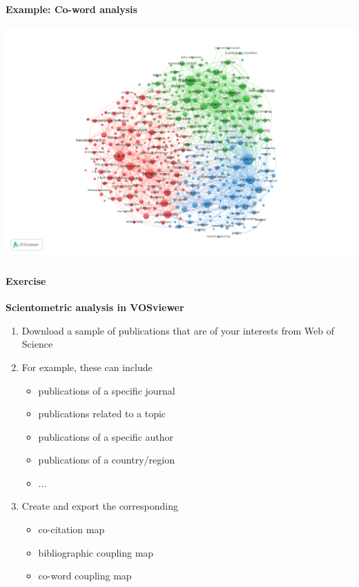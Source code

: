 \documentclass[8pt]{beamer}
\begin{document}
\begin{frame}
\frametitle{\insertsection}
\framesubtitle{Example: Co-word analysis}

\centering
\includegraphics[height = 0.8\textheight]{RP_20082018_coword}

\end{frame}


\begin{frame}
\frametitle{\insertsection}
\framesubtitle{Exercise}

\textbf{Scientometric analysis in VOSviewer}
\medskip

\begin{enumerate}
\item Download a {\color{blue}sample of publications} that are of your interests from Web of Science
\medskip

\item For example, these can include
	\begin{itemize}
	\item publications of a specific journal
	\item publications related to a topic
	\item publications of a specific author
	\item publications of a country/region
	\item ...
	\end{itemize}
\medskip
	
\item Create and export the corresponding
	\begin{itemize}
	\item {\color{blue}co-citation} map
	\item {\color{blue}bibliographic coupling} map
	\item {\color{blue}co-word coupling} map
	\end{itemize} 

\end{enumerate}

\end{frame}
\end{document}
